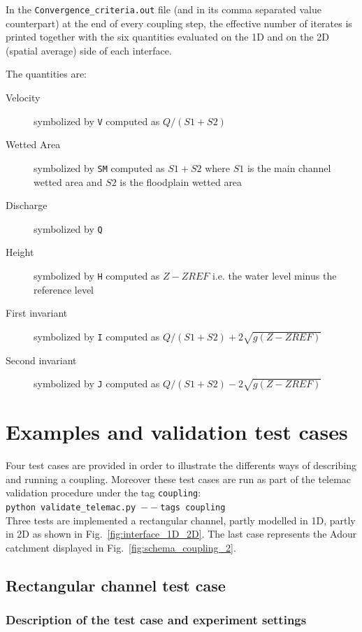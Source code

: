 In the \texttt{Convergence\_criteria.out} file (and in its comma
separated value counterpart) at the end of every coupling step, the
effective number of iterates is printed together with the six quantities
evaluated on the 1D and on the 2D (spatial average) side of each
interface.

The quantities are:
\begin{description}
\item[Velocity] symbolized by \texttt{V} computed as $Q/(S1+S2)$
\item[Wetted Area] symbolized by \texttt{SM} computed as $S1+S2$ where
  $S1$ is the main channel wetted area and $S2$ is the floodplain
  wetted area
\item[Discharge] symbolized by \texttt{Q}
\item[Height] symbolized by \texttt{H} computed as $Z-ZREF$ i.e. the
  water level minus the reference level
\item[First invariant] symbolized by \texttt{I} computed as $Q/(S1+S2)+2\sqrt{g(Z-ZREF)}$
\item[Second invariant] symbolized by \texttt{J} computed as $Q/(S1+S2)-2\sqrt{g(Z-ZREF)}$
\end{description}

\chapter{Examples and validation test cases}

Four test cases are provided in order to illustrate the differents
ways of describing and running a coupling. Moreover these test cases
are run as part of the telemac validation procedure under the tag
\texttt{coupling}:\\
\texttt{python validate\_telemac.py $--$tags coupling}\\

Three tests are implemented a rectangular channel, partly modelled in 1D,
partly in 2D as shown in Fig.~\ref{fig:interface_1D_2D}. The last case
represents the Adour catchment displayed
in Fig.~\ref{fig:schema_coupling_2}.

\section{Rectangular channel test case}

\subsection{Description of the test case and experiment settings}

